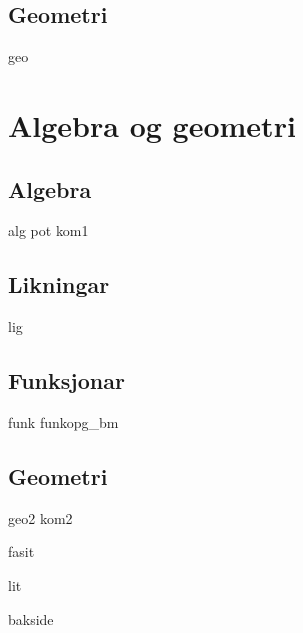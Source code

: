 \chapter{Geometri}
\newpage
{geo}

\part{Algebra og geometri \label{Del2}}
\chapter{Algebra}
\newpage
{alg}
{pot}
\newpage
{kom1}

\chapter{Likningar \label{Likningar}}
\newpage
{lig}

\chapter{Funksjonar \label{Funksjoner}}
{funk}
\opgt
{funkopg_bm}

\chapter{Geometri}
\newpage
{geo2}
\newpage
{kom2}

\newpage
{}
{}
{fasit}

{lit}
{\printindex {}
	}
{bakside}











